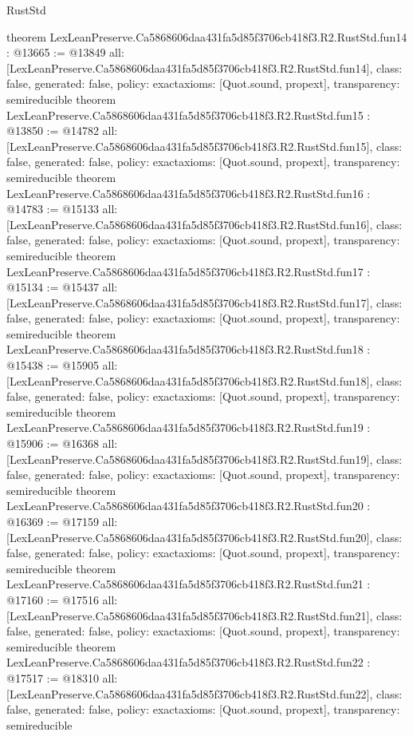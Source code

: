 \begin{lexlean}{RustStd}
\begin{coremodule}
{}
theorem LexLeanPreserve.Ca5868606daa431fa5d85f3706cb418f3.R2.RustStd.fun14 : @13665 := @13849 {
  all: [LexLeanPreserve.Ca5868606daa431fa5d85f3706cb418f3.R2.RustStd.fun14],
  class: false,
  generated: false,
  policy: exact{axioms: [Quot.sound, propext]},
  transparency: semireducible
}
theorem LexLeanPreserve.Ca5868606daa431fa5d85f3706cb418f3.R2.RustStd.fun15 : @13850 := @14782 {
  all: [LexLeanPreserve.Ca5868606daa431fa5d85f3706cb418f3.R2.RustStd.fun15],
  class: false,
  generated: false,
  policy: exact{axioms: [Quot.sound, propext]},
  transparency: semireducible
}
theorem LexLeanPreserve.Ca5868606daa431fa5d85f3706cb418f3.R2.RustStd.fun16 : @14783 := @15133 {
  all: [LexLeanPreserve.Ca5868606daa431fa5d85f3706cb418f3.R2.RustStd.fun16],
  class: false,
  generated: false,
  policy: exact{axioms: [Quot.sound, propext]},
  transparency: semireducible
}
theorem LexLeanPreserve.Ca5868606daa431fa5d85f3706cb418f3.R2.RustStd.fun17 : @15134 := @15437 {
  all: [LexLeanPreserve.Ca5868606daa431fa5d85f3706cb418f3.R2.RustStd.fun17],
  class: false,
  generated: false,
  policy: exact{axioms: [Quot.sound, propext]},
  transparency: semireducible
}
theorem LexLeanPreserve.Ca5868606daa431fa5d85f3706cb418f3.R2.RustStd.fun18 : @15438 := @15905 {
  all: [LexLeanPreserve.Ca5868606daa431fa5d85f3706cb418f3.R2.RustStd.fun18],
  class: false,
  generated: false,
  policy: exact{axioms: [Quot.sound, propext]},
  transparency: semireducible
}
theorem LexLeanPreserve.Ca5868606daa431fa5d85f3706cb418f3.R2.RustStd.fun19 : @15906 := @16368 {
  all: [LexLeanPreserve.Ca5868606daa431fa5d85f3706cb418f3.R2.RustStd.fun19],
  class: false,
  generated: false,
  policy: exact{axioms: [Quot.sound, propext]},
  transparency: semireducible
}
theorem LexLeanPreserve.Ca5868606daa431fa5d85f3706cb418f3.R2.RustStd.fun20 : @16369 := @17159 {
  all: [LexLeanPreserve.Ca5868606daa431fa5d85f3706cb418f3.R2.RustStd.fun20],
  class: false,
  generated: false,
  policy: exact{axioms: [Quot.sound, propext]},
  transparency: semireducible
}
theorem LexLeanPreserve.Ca5868606daa431fa5d85f3706cb418f3.R2.RustStd.fun21 : @17160 := @17516 {
  all: [LexLeanPreserve.Ca5868606daa431fa5d85f3706cb418f3.R2.RustStd.fun21],
  class: false,
  generated: false,
  policy: exact{axioms: [Quot.sound, propext]},
  transparency: semireducible
}
theorem LexLeanPreserve.Ca5868606daa431fa5d85f3706cb418f3.R2.RustStd.fun22 : @17517 := @18310 {
  all: [LexLeanPreserve.Ca5868606daa431fa5d85f3706cb418f3.R2.RustStd.fun22],
  class: false,
  generated: false,
  policy: exact{axioms: [Quot.sound, propext]},
  transparency: semireducible
}
\end{coremodule}
\end{lexlean}
